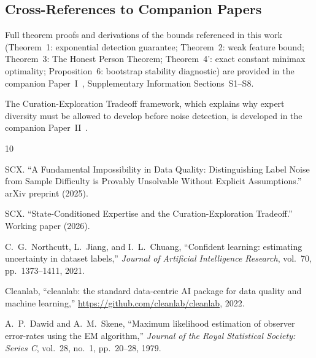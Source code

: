 \documentclass[11pt,a4paper]{article}
\begin{document}
\subsection{Cross-References to Companion Papers}

Full theorem proofs and derivations of the bounds referenced in this work (Theorem~1: exponential detection guarantee; Theorem~2: weak feature bound; Theorem~3: The Honest Person Theorem; Theorem~4': exact constant minimax optimality; Proposition~6: bootstrap stability diagnostic) are provided in the companion Paper~I~\cite{xi2025fundamental}, Supplementary Information Sections~S1--S8.

The Curation-Exploration Tradeoff framework, which explains why expert diversity must be allowed to develop before noise detection, is developed in the companion Paper~II~\cite{scx2025curation}.

\begin{thebibliography}{10}

SCX. ``A Fundamental Impossibility in Data Quality: Distinguishing Label Noise from Sample Difficulty is Provably Unsolvable Without Explicit Assumptions.'' arXiv preprint (2025).

SCX. ``State-Conditioned Expertise and the Curation-Exploration Tradeoff.'' Working paper (2026).

C.~G.~Northcutt, L.~Jiang, and I.~L.~Chuang, ``Confident learning: estimating uncertainty in dataset labels,'' \textit{Journal of Artificial Intelligence Research}, vol.~70, pp.~1373--1411, 2021.

Cleanlab, ``cleanlab: the standard data-centric AI package for data quality and machine learning,'' \url{https://github.com/cleanlab/cleanlab}, 2022.

A.~P.~Dawid and A.~M.~Skene, ``Maximum likelihood estimation of observer error-rates using the EM algorithm,'' \textit{Journal of the Royal Statistical Society: Series C}, vol.~28, no.~1, pp.~20--28, 1979.

\end{thebibliography}
\end{document}
